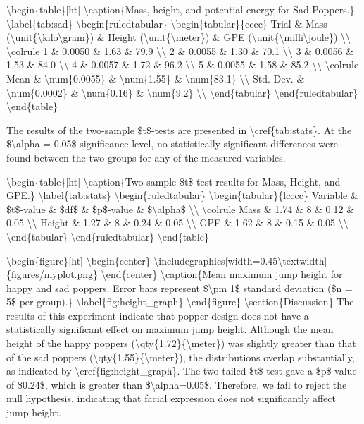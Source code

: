 \textbackslash begin\{table\}{[}ht{]} \textbackslash caption\{Mass,
height, and potential energy for Sad Poppers.\}
\textbackslash label\{tab:sad\} \textbackslash begin\{ruledtabular\}
\textbackslash begin\{tabular\}\{cccc\} Trial \& Mass
(\textbackslash unit\{\textbackslash kilo\textbackslash gram\}) \&
Height (\textbackslash unit\{\textbackslash meter\}) \& GPE
(\textbackslash unit\{\textbackslash milli\textbackslash joule\})
\textbackslash\textbackslash{} \textbackslash colrule 1 \& 0.0050 \&
1.63 \& 79.9 \textbackslash\textbackslash{} 2 \& 0.0055 \& 1.30 \& 70.1
\textbackslash\textbackslash{} 3 \& 0.0056 \& 1.53 \& 84.0
\textbackslash\textbackslash{} 4 \& 0.0057 \& 1.72 \& 96.2
\textbackslash\textbackslash{} 5 \& 0.0055 \& 1.58 \& 85.2
\textbackslash\textbackslash{} \textbackslash colrule Mean \&
\textbackslash num\{0.0055\} \& \textbackslash num\{1.55\} \&
\textbackslash num\{83.1\} \textbackslash\textbackslash{} Std. Dev. \&
\textbackslash num\{0.0002\} \& \textbackslash num\{0.16\} \&
\textbackslash num\{9.2\} \textbackslash\textbackslash{}
\textbackslash end\{tabular\} \textbackslash end\{ruledtabular\}
\textbackslash end\{table\}

The results of the two-sample \$t\$-tests are presented in
\textbackslash cref\{tab:stats\}. At the \$\textbackslash alpha = 0.05\$
significance level, no statistically significant differences were found
between the two groups for any of the measured variables.

\textbackslash begin\{table\}{[}ht{]} \textbackslash caption\{Two-sample
\$t\$-test results for Mass, Height, and GPE.\}
\textbackslash label\{tab:stats\} \textbackslash begin\{ruledtabular\}
\textbackslash begin\{tabular\}\{lcccc\} Variable \& \$t\$-value \&
\$df\$ \& \$p\$-value \& \$\textbackslash alpha\$
\textbackslash\textbackslash{} \textbackslash colrule Mass \& 1.74 \& 8
\& 0.12 \& 0.05 \textbackslash\textbackslash{} Height \& 1.27 \& 8 \&
0.24 \& 0.05 \textbackslash\textbackslash{} GPE \& 1.62 \& 8 \& 0.15 \&
0.05 \textbackslash\textbackslash{} \textbackslash end\{tabular\}
\textbackslash end\{ruledtabular\} \textbackslash end\{table\}

\textbackslash begin\{figure\}{[}ht{]} \textbackslash begin\{center\}
\textbackslash includegraphics{[}width=0.45\textbackslash textwidth{]}\{figures/myplot.png\}
\textbackslash end\{center\} \textbackslash caption\{Mean maximum jump
height for happy and sad poppers. Error bars represent
\$\textbackslash pm 1\$ standard deviation (\$n = 5\$ per group).\}
\textbackslash label\{fig:height\_graph\} \textbackslash end\{figure\}
\textbackslash section\{Discussion\} The results of this experiment
indicate that popper design does not have a statistically significant
effect on maximum jump height. Although the mean height of the happy
poppers (\textbackslash qty\{1.72\}\{\textbackslash meter\}) was
slightly greater than that of the sad poppers
(\textbackslash qty\{1.55\}\{\textbackslash meter\}), the distributions
overlap substantially, as indicated by
\textbackslash cref\{fig:height\_graph\}. The two-tailed \$t\$-test gave
a \$p\$-value of \$0.24\$, which is greater than
\$\textbackslash alpha=0.05\$. Therefore, we fail to reject the null
hypothesis, indicating that facial expression does not significantly
affect jump height.

